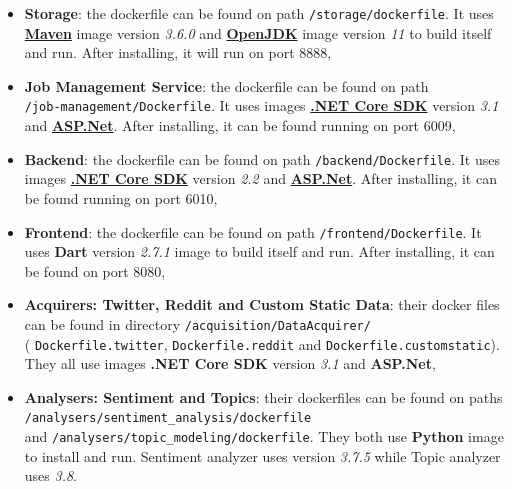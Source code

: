 \documentclass{article}
\begin{document}
\begin{itemize}
    \item \textbf{Storage}: the dockerfile can be found on path \texttt{/storage/dockerfile}. It uses \textbf{\href{https://maven.apache.org/}{Maven}} image  version \textit{3.6.0} and  \textbf{\href{https://openjdk.java.net/}{OpenJDK}} image  version \textit{11} to build itself and run. After installing, it will run on port 8888,
    
    \item \textbf{Job Management Service}: the dockerfile can be found on path \\ \texttt{/job-management/Dockerfile}. It uses images \textbf{\href{https://dotnet.microsoft.com/download}{.NET Core SDK}}  version \textit{3.1} and \textbf{\href{https://dotnet.microsoft.com/apps/aspnet}{ASP.Net}}. After installing, it can be found running on port 6009,
    
    \item \textbf{Backend}: the dockerfile can be found on path \texttt{/backend/Dockerfile}. It uses images \textbf{\href{https://dotnet.microsoft.com/download}{.NET Core SDK}}  version \textit{2.2} and \textbf{\href{https://dotnet.microsoft.com/apps/aspnet}{ASP.Net}}. After installing, it can be found running on port 6010,
    
    \item \textbf{Frontend}: the dockerfile can be found on path \texttt{/frontend/Dockerfile}. It uses \textbf{Dart} version \textit{2.7.1} image to build itself and run. After installing, it can be found on port 8080,
    
    \item \textbf{Acquirers: Twitter, Reddit and Custom Static Data}: their docker files can be found in directory \texttt{/acquisition/DataAcquirer/} \\( \texttt{Dockerfile.twitter}, \texttt{Dockerfile.reddit} and \texttt{Dockerfile.customstatic}). They all use images \textbf{.NET Core SDK} version \textit{3.1} and \textbf{ASP.Net},
    
    \item \textbf{Analysers: Sentiment and Topics}: their dockerfiles can be found on paths \texttt{/analysers/sentiment\_analysis/dockerfile}\\ and \texttt{/analysers/topic\_modeling/dockerfile}. They both use \textbf{Python} image to install and run. Sentiment analyzer uses version \textit{3.7.5} while Topic analyzer uses \textit{3.8}. 
    
\end{itemize}
\end{document}
